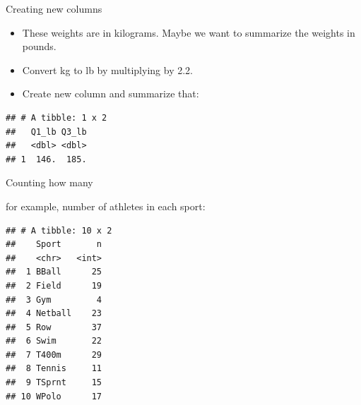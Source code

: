 \documentclass[ignorenonframetext,]{beamer}
\newenvironment{Shaded}{\begin{snugshade}}{\end{snugshade}}
\newcommand{\DataTypeTok}[1]{\textcolor[rgb]{0.13,0.29,0.53}{#1}}
\newcommand{\FloatTok}[1]{\textcolor[rgb]{0.00,0.00,0.81}{#1}}
\newcommand{\KeywordTok}[1]{\textcolor[rgb]{0.13,0.29,0.53}{\textbf{#1}}}
\newcommand{\NormalTok}[1]{#1}
\newcommand{\OperatorTok}[1]{\textcolor[rgb]{0.81,0.36,0.00}{\textbf{#1}}}
\newcommand{\StringTok}[1]{\textcolor[rgb]{0.31,0.60,0.02}{#1}}
\providecommand{\tightlist}{%
  \setlength{\itemsep}{0pt}\setlength{\parskip}{0pt}}
\begin{document}
\begin{frame}[fragile]{Creating new columns}
\protect\hypertarget{creating-new-columns}{}

\begin{itemize}
\tightlist
\item
  These weights are in kilograms. Maybe we want to summarize the weights
  in pounds.
\item
  Convert kg to lb by multiplying by 2.2.
\item
  Create new column and summarize that:
\end{itemize}

\begin{Shaded}
\end{Shaded}

\begin{verbatim}
## # A tibble: 1 x 2
##   Q1_lb Q3_lb
##   <dbl> <dbl>
## 1  146.  185.
\end{verbatim}

\end{frame}

\begin{frame}[fragile]{Counting how many}
\protect\hypertarget{counting-how-many}{}

for example, number of athletes in each sport:

\begin{Shaded}
\end{Shaded}

\begin{verbatim}
## # A tibble: 10 x 2
##    Sport       n
##    <chr>   <int>
##  1 BBall      25
##  2 Field      19
##  3 Gym         4
##  4 Netball    23
##  5 Row        37
##  6 Swim       22
##  7 T400m      29
##  8 Tennis     11
##  9 TSprnt     15
## 10 WPolo      17
\end{verbatim}

\end{frame}
\end{document}
